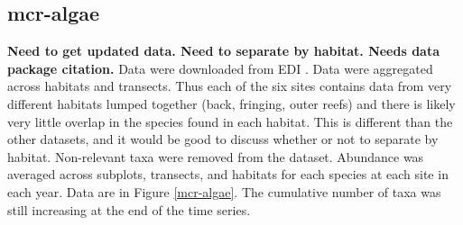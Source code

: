 \documentclass[11pt, oneside]{article}
\begin{document}
\subsection {mcr-algae}
{\bf Need to get updated data. Need to separate by habitat. Needs data package citation.}
Data were downloaded from EDI \citep{mcr-algae}.
Data were aggregated across habitats and transects.
Thus each of the six sites contains data from very different habitats lumped together (back, fringing, outer reefs) and there is likely very little overlap in the species found in each habitat. 
This is different than the other datasets, and it would be good to discuss whether or not to separate by habitat.
Non-relevant taxa were removed from the dataset.
Abundance was averaged across subplots, transects, and habitats for each species at each site in each year.
Data are in Figure \ref{mcr-algae}.
The cumulative number of taxa was still increasing at the end of the time series.
\end{document}
